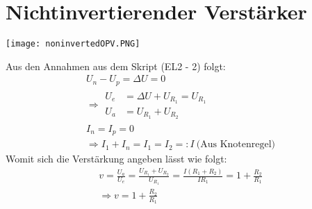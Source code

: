 \section{Nichtinvertierender Verstärker}
\label{sec:noninvertedOPV}
\begin{center}
    \texttt{[image: noninvertedOPV.PNG]} %
\end{center}
Aus den Annahmen aus dem Skript (EL2 - 2) folgt:
\begin{gather}
    U_n - U_p = \Delta U = 0\\
    \Rightarrow
    \begin{aligned}
        U_e&= \Delta U + U_{R_1} = U_{R_1}\\
        U_a&= U_{R_1} + U_{R_2}
    \end{aligned}\\[0.5cm]
    I_n = I_p = 0\\
    \Rightarrow I_1 + I_n = I_1 = I_2 =: I~\text{(Aus Knotenregel)}
\end{gather}
Womit sich die Verstärkung angeben lässt wie folgt:
\begin{gather}
    v = \frac{U_a}{U_e} = \frac{U_{R_1} + U_{R_2}}{U_{R_1}} = \frac{I (R_1+R_2)}{I R_1} = 1 + \frac{R_2}{R_1}\\[0.5cm]
    \Rightarrow \boxed{v = 1 + \frac{R_2}{R_1}}
\end{gather}

